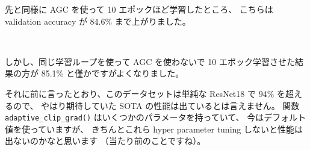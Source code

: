 \documentclass[dvipdfmx,autodetect-engine,10pt,b5paper,papersize,openany,dvipsnames]{jsbook}
\begin{document}
\begin{multicols}{2}
\vspace{5.0cm}

先と同様に AGC を使って 10 エポックほど学習したところ、
こちらは validation accuracy が 84.6\% まで上がりました。


\vspace{2.8cm}


しかし、同じ学習ループを使って AGC を使わないで 10 エポック学習させた結果の方が
 85.1\% と僅かですがよくなりました。


\vspace{4.5cm}

それに前に言ったとおり、このデータセットは単純な ResNet18 で $94\%$ を超えるので、
やはり期待していた SOTA の性能は出ているとは言えません。
関数 \texttt{adaptive\_clip\_grad()} はいくつかのパラメータを持っていて、
今はデフォルト値を使っていますが、
きちんとこれら hyper parameter tuning しないと性能は出ないのかなと思います
（当たり前のことですね）。



\end{multicols}
\end{document}
